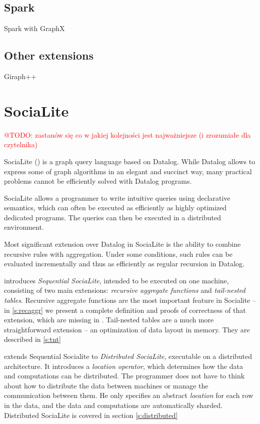 \documentclass{pracamgr}
\makeatletter
\theoremstyle{plain}
\theoremstyle{definition}
\theoremstyle{remark}
\newcommand{\todo}[1]{\textcolor{red}{@TODO: #1}}
\makeatother
\begin{document}
\section{Spark}
Spark with GraphX

\section{Other extensions}
Giraph++



\chapter{SociaLite}\label{r:socialite}

\todo{zastanów się co w jakiej kolejności jest najważniejsze (i zrozumiałe dla czytelnika)}

SociaLite (\cite{socialite, distsoc}) is a graph query language based on Datalog. While Datalog allows to express some of graph algorithms
in an elegant and succinct way, many practical problems cannot be efficiently solved with Datalog programs. 

SociaLite allows a programmer to write intuitive queries using declarative semantics, which can often be executed as efficiently as highly optimized dedicated programs. The queries can then be executed in a distributed environment.

Most significant extension over Datalog in SociaLite is the ability to combine recursive rules with aggregation. Under some conditions, such rules can be evaluated incrementally and thus as efficiently as regular recursion in Datalog.

\cite{socialite} introduces \emph{Sequential SociaLite}, intended to be executed on one machine, consisting of two main extensions: \emph{recursive aggregate functions} and \emph{tail-nested tables}. Recursive aggregate functions are the most important feature in Socialite -- in \ref{s:recaggr} we present a complete definition and proofs of correctness of that extension, which are missing in \cite{socialite}. Tail-nested tables are a much more straightforward extension -- an optimization of data layout in memory. They are described in \ref{s:tnt}

\cite{distsoc} extends Sequential Socialite to \emph{Distributed SociaLite}, executable on a distributed architecture. It introduces a \emph{location operator}, which determines how the data and computations can be distributed. The programmer does not have to think about how to distribute the data between machines or manage the communication between them. He only specifies an abstract \emph{location} for each row in the data, and the data and computations are automatically sharded. Distributed SociaLite is covered in section \ref{s:distributed}
\end{document}
